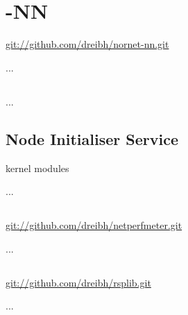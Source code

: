 \section{-NN}

\url{git://github.com/dreibh/nornet-nn.git}

...

\subsection{}

...

\subsection{Node Initialiser Service}

kernel modules

...


\subsection{}

\url{git://github.com/dreibh/netperfmeter.git}

...

\subsection{}

\url{git://github.com/dreibh/rsplib.git}

...

\subsection{}

